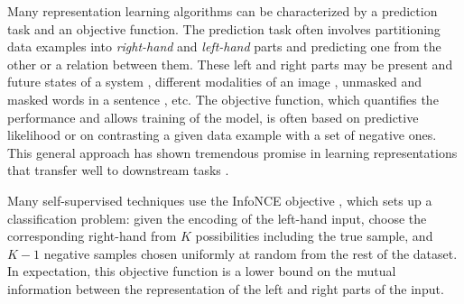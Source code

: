 
Many representation learning algorithms can be characterized by a prediction task and an objective function.
The prediction task often involves partitioning data examples into \textit{right-hand} and \textit{left-hand} parts and predicting one from the other or a relation between them.
These left and right parts may be present and future states of a system \cite{oord2018representation}, different modalities of an image \cite{tian2019contrastive}, unmasked and masked words in a sentence \cite{devlin2018bert}, etc.
The objective function, which quantifies the performance and allows training of the model, is often based on predictive likelihood or on contrasting a given data example with a set of negative ones.
This general approach has shown tremendous promise in learning representations that transfer well to downstream tasks \cite{devlin2018bert,henaff2019data}.




Many self-supervised techniques use the InfoNCE objective \cite{oord2018representation,tian2019contrastive,hjelm2018learning}, which sets up a classification problem: given the encoding of the left-hand input, choose the corresponding right-hand from $K$ possibilities including the true sample, and $K-1$ negative samples chosen uniformly at random from the rest of the dataset. 
In expectation, this objective function is a lower bound on the mutual information between the representation of the left and right parts of the input.

